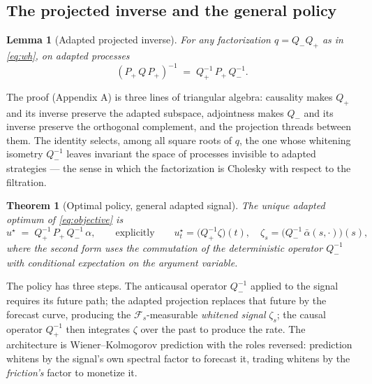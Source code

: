 \documentclass[11pt]{article}
\newcommand{\F}{\mathcal{F}}
\theoremstyle{plain}
\newtheorem{theorem}{Theorem}
\newtheorem{lemma}{Lemma}
\begin{document}
\subsection{The projected inverse and the general policy}

\begin{lemma}[Adapted projected inverse]\label{lem:pi}
For any factorization $q = Q_-Q_+$ as in \eqref{eq:wh}, on adapted processes
\begin{equation}\label{eq:pi}
(P_+\,Q\,P_+)^{-1} \;=\; Q_+^{-1}\,P_+\,Q_-^{-1}.
\end{equation}
\end{lemma}

The proof (Appendix A) is three lines of triangular algebra: causality makes $Q_+$ and its inverse preserve the adapted subspace, adjointness makes $Q_-$ and its inverse preserve the orthogonal complement, and the projection threads between them. The identity selects, among all square roots of $q$, the one whose whitening isometry $Q_-^{-1}$ leaves invariant the space of processes invisible to adapted strategies --- the sense in which the factorization is Cholesky with respect to the filtration.

\begin{theorem}[Optimal policy, general adapted signal]\label{thm:general}
The unique adapted optimum of \eqref{eq:objective} is
\begin{equation}\label{eq:policy}
u^\star \;=\; Q_+^{-1}\,P_+\,Q_-^{-1}\,\alpha,
\qquad\text{explicitly}\qquad
u^\star_t = \bigl(Q_+^{-1}\zeta\bigr)(t), \quad
\zeta_s = \bigl(Q_-^{-1}\,\bar\alpha(s,\cdot)\bigr)(s),
\end{equation}
where the second form uses the commutation of the deterministic operator $Q_-^{-1}$ with conditional expectation on the argument variable.
\end{theorem}

The policy has three steps. The anticausal operator $Q_-^{-1}$ applied to the signal requires its future path; the adapted projection replaces that future by the forecast curve, producing the $\F_s$-measurable \emph{whitened signal} $\zeta_s$; the causal operator $Q_+^{-1}$ then integrates $\zeta$ over the past to produce the rate. The architecture is Wiener--Kolmogorov prediction with the roles reversed: prediction whitens by the signal's own spectral factor to forecast it, trading whitens by the \emph{friction's} factor to monetize it.
\end{document}
